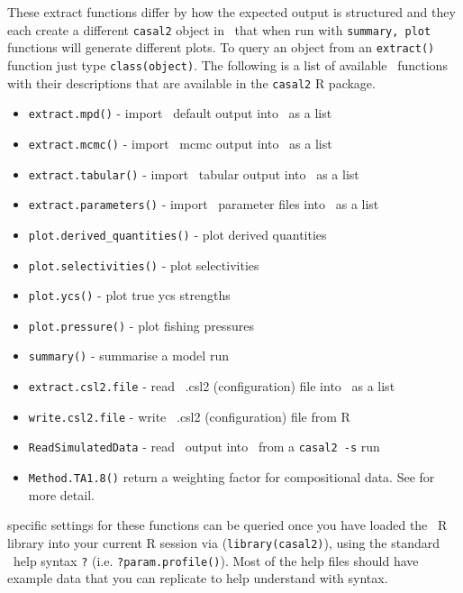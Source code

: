 These extract functions differ by how the expected output is structured and they each create a different \texttt{casal2} object in \R\ that when run with \texttt{summary, plot} functions will generate different plots. To query an object from an \texttt{extract()} function just type \texttt{class(object)}. The following is a list of available \R\ functions with their descriptions that are available in the \texttt{casal2} R package.

\begin{itemize}
	\item \texttt{extract.mpd()} - import \CNAME\ default output into \R\ as a list
	\item \texttt{extract.mcmc()} - import \CNAME\ mcmc output into \R\ as a list
	\item \texttt{extract.tabular()} - import \CNAME\ tabular output into \R\ as a list
	\item \texttt{extract.parameters()} - import \CNAME\ parameter files into \R\ as a list
	\item \texttt{plot.derived\_quantities()} - plot derived quantities
	\item \texttt{plot.selectivities()} - plot selectivities
	\item \texttt{plot.ycs()} - plot true ycs strengths
	\item \texttt{plot.pressure()} - plot fishing pressures		
	\item \texttt{summary()} - summarise a model run	
	\item \texttt{extract.csl2.file} - read \CNAME\ .csl2 (configuration) file into \R\ as a list
	\item \texttt{write.csl2.file} - write \CNAME\ .csl2 (configuration) file from R
	\item \texttt{ReadSimulatedData} - read \CNAME\ output into \R\ from a \texttt{casal2 -s} run		
	\item \texttt{Method.TA1.8()} return a weighting factor for compositional data. See \cite{francis2011data} for more detail.
	
\end{itemize}

specific settings for these functions can be queried once you have loaded the \CNAME\ R library into your current R session via (\texttt{library(casal2)}), using the standard \R\ help syntax \texttt{?} (i.e. \texttt{?param.profile()}). Most of the help files should have example data that you can replicate to help understand with syntax.
\\
